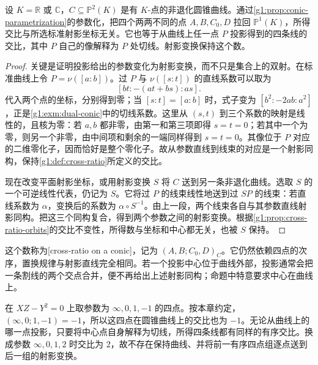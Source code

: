 \begin{proposition}\label{g1:prop:conic-cross-ratio}
	设 \(K=\mathbb R\) 或 \(\mathbb C\)，\(C\subseteq\mathbb P^2(K)\) 是有 \(K\)-点的非退化圆锥曲线。通过\cref{g1:prop:conic-parametrization}的参数化，把四个两两不同的点 \(A,B,C_0,D\) 拉回 \(\mathbb P^1(K)\)，所得交比与所选标准射影坐标无关。它也等于从曲线上任一点 \(P\) 投影得到的四条线的交比，其中 \(P\) 自己的像解释为 \(P\) 处切线。射影变换保持这个数。
\end{proposition}
\begin{proof}
	关键是证明投影给出的参数变化为射影变换，而不只是集合上的双射。在标准曲线上令 \(P=\nu([a:b])\)。过 \(P\) 与 \(\nu([s:t])\) 的直线系数可以取为
	\begin{equation}\label{g1:eq:conic-pencil-map}
		[bt:-(at+bs):as].
	\end{equation}
	代入两个点的坐标，分别得到零；当 \([s:t]=[a:b]\) 时，式子变为 \([b^2:-2ab:a^2]\)，正是\cref{g1:exm:dual-conic}中的切线系数。这里从 \((s,t)\) 到三个系数的映射是线性的，且核为零：若 \(a,b\) 都非零，由第一和第三项即得 \(s=t=0\)；若其中一个为零，则另一个非零，由中间项和剩余的一端同样得到 \(s=t=0\)。其像位于 \(P\) 对应的二维零化子，因而恰好是整个零化子。故从参数直线到线束的对应是一个射影同构，保持\cref{g1:def:cross-ratio}所定义的交比。

	现在改变平面射影坐标，或用射影变换 \(S\) 将 \(C\) 送到另一条非退化曲线。选取 \(S\) 的一个可逆线性代表，仍记为 \(S\)。它将过 \(P\) 的线束线性地送到过 \(SP\) 的线束：若直线系数为 \(\alpha\)，变换后的系数为 \(\alpha\circ S^{-1}\)。由上一段，两个线束各自与其参数直线射影同构。把这三个同构复合，得到两个参数之间的射影变换。根据\cref{g1:prop:cross-ratio-orbits}的交比不变性，所得数与坐标和中心都无关，也被 \(S\) 保持。
\end{proof}

这个数称为[cross-ratio on a conic]，记为 \((A,B;C_0,D)_C\)。它仍然依赖四点的次序，置换规律与射影直线完全相同。若一个投影中心位于曲线外部，投影通常会把一条割线的两个交点合并，便不再给出上述射影同构；命题中特意要求中心在曲线上。

\begin{example}\label{g1:exm:conic-cross-ratio}
	在 \(XZ-Y^2=0\) 上取参数为 \(\infty,0,1,-1\) 的四点。按本章约定，\((\infty,0;1,-1)=-1\)，所以这四点在圆锥曲线上的交比也为 \(-1\)。无论从曲线上的哪一点投影，只要将中心点自身解释为切线，所得四条线都有同样的有序交比。换成参数 \(\infty,0,1,2\) 时交比为 \(2\)，故不存在保持曲线、并将前一有序四点组逐点送到后一组的射影变换。
\end{example}

